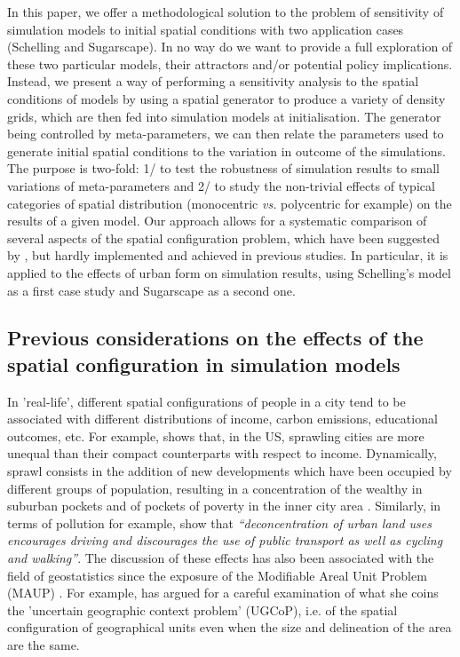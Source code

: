 \documentclass[3p,times,procedia]{elsarticle}
\begin{document}
In this paper, we offer a methodological solution to the problem of sensitivity of simulation models to initial spatial conditions with two application cases (Schelling and Sugarscape). In no way do we want to provide a full exploration of these two particular models, their attractors and/or potential policy implications. Instead, we present a way of performing a sensitivity analysis to the spatial conditions of models by using a spatial generator to produce a variety of density grids, which are then fed into simulation models at initialisation. The generator being controlled by meta-parameters, we can then relate the parameters used to generate initial spatial conditions to the variation in outcome of the simulations. The purpose is two-fold: 1/ to test the robustness of simulation results to small variations of meta-parameters and 2/ to study the non-trivial effects of typical categories of spatial distribution (monocentric \textit{vs.} polycentric for example) on the results of a given model. Our approach allows for a systematic comparison of several aspects of the spatial configuration problem, which have been suggested by \citet{filatova2013spatial}, but hardly implemented and achieved in previous studies. In particular, it is applied to the effects of urban form on simulation results, using Schelling's model as a first case study and Sugarscape as a second one. 

\subsection{Previous considerations on the effects of the spatial configuration in simulation models}



In 'real-life', different spatial configurations of people in a city tend to be associated with different distributions of income, carbon emissions, educational outcomes, etc. For example, \citet{wheeler2006urban} shows that, in the US, sprawling cities are more unequal than their compact counterparts with respect to income. Dynamically, sprawl consists in the addition of new developments which have been occupied by different groups of population, resulting in a concentration of the wealthy in suburban pockets and of pockets of poverty in the inner city area \citep{jargowsky2002sprawl}. Similarly, in terms of pollution for example, \citet[p.173]{schwanen2001travel} show that \textit{``deconcentration of urban land uses encourages driving and discourages the use of public transport as well as cycling and walking''}. The discussion of these effects has also been associated with the field of geostatistics since the exposure of the Modifiable Areal Unit Problem (MAUP) \citep{Openshaw1984, FotheringhamWong1991}. For example, \citet{Kwan2012} has argued for a careful examination of what she coins the 'uncertain geographic context problem' (UGCoP), i.e. of the spatial configuration of geographical units even when the size and delineation of the area are the same.\\
\end{document}
